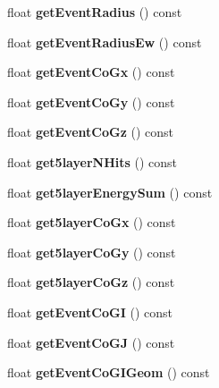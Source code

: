 \begin{DoxyCompactItemize}
\item 
float {\bfseries get\-Event\-Radius} () const \label{classCALICE_1_1EventVariables_ae9a03cf002670dd03c167d853a5ac777}

\item 
float {\bfseries get\-Event\-Radius\-Ew} () const \label{classCALICE_1_1EventVariables_aa43e5c1ce2f49b73d6fef5febb560f42}

\item 
float {\bfseries get\-Event\-Co\-Gx} () const \label{classCALICE_1_1EventVariables_a075c3bee0ef07af33d6fcfd10715221f}

\item 
float {\bfseries get\-Event\-Co\-Gy} () const \label{classCALICE_1_1EventVariables_a6083c8b5524c1cdc2370aa8512a863ff}

\item 
float {\bfseries get\-Event\-Co\-Gz} () const \label{classCALICE_1_1EventVariables_a3680ff085103ee9174fb80d505ecff86}

\item 
float {\bfseries get5layer\-N\-Hits} () const \label{classCALICE_1_1EventVariables_a72dc1908fefecb1e9d88ae834411b797}

\item 
float {\bfseries get5layer\-Energy\-Sum} () const \label{classCALICE_1_1EventVariables_a41a426e075d74c08b3632ea63c59aa18}

\item 
float {\bfseries get5layer\-Co\-Gx} () const \label{classCALICE_1_1EventVariables_a30cd867ba4b3a01edf85b28181c9905d}

\item 
float {\bfseries get5layer\-Co\-Gy} () const \label{classCALICE_1_1EventVariables_a352566ef83ecd60cacf019fed1770c76}

\item 
float {\bfseries get5layer\-Co\-Gz} () const \label{classCALICE_1_1EventVariables_a1f713080f084fbb061a1a5a668a3b802}

\item 
float {\bfseries get\-Event\-Co\-G\-I} () const \label{classCALICE_1_1EventVariables_aa91c11f939bc1b7ba0dce6656e125ad2}

\item 
float {\bfseries get\-Event\-Co\-G\-J} () const \label{classCALICE_1_1EventVariables_a5a4735f92347a277849a0e8f7694f52c}

\item 
float {\bfseries get\-Event\-Co\-G\-I\-Geom} () const \label{classCALICE_1_1EventVariables_ac1f7f19f0c75ff2ff9e238c2694c8ff5}


\end{DoxyCompactItemize}
